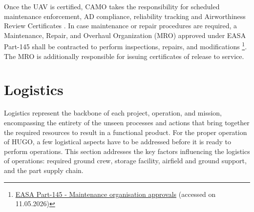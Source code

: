 Once the UAV is certified, CAMO takes the responsibility for scheduled maintenance enforcement, AD compliance, reliability tracking and Airworthiness Review Certificates \cite{EASA_CAirworthiness}. In case maintenance or repair procedures are required, a Maintenance, Repair, and Overhaul Organization (MRO) approved under EASA Part-145 shall be contracted to perform inspections, repairs, and modifications \footnote{\href{https://www.easa.europa.eu/en/acceptable-means-compliance-and-guidance-material-group/part-145-maintenance-organisation-approvals}{EASA Part-145 - Maintenance organisation approvals} (accessed on 11.05.2026)}. The MRO is additionally responsible for issuing certificates of release to service.









\section{Logistics}
\label{sec:logistics}
Logistics represent the backbone of each project, operation, and mission, encompassing the entirety of the unseen processes and actions that bring together the required resources to result in a functional product. For the proper operation of HUGO, a few logistical aspects have to be addressed before it is ready to perform operations. This section addresses the key factors influencing the logistics of operations: required ground crew, storage facility, airfield and ground support, and the part supply chain.




